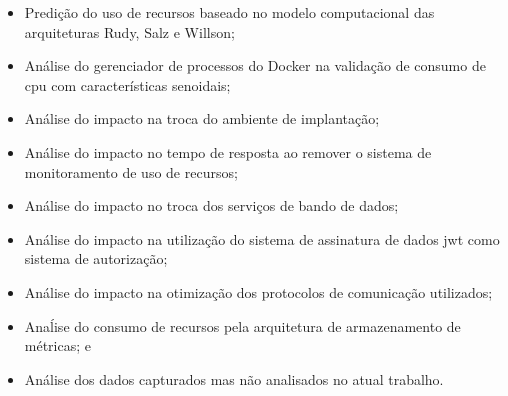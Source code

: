 \begin{itemize}
 \item Predição do uso de recursos baseado no modelo computacional das arquiteturas Rudy, Salz e Willson;
 \item Análise do gerenciador de processos do Docker na validação de consumo de \ac{cpu} com características senoidais;
 \item Análise do impacto na troca do ambiente de implantação;
 \item Análise do impacto no tempo de resposta ao remover o sistema de monitoramento de uso de recursos;
 \item Análise do impacto no troca dos serviços de bando de dados;
 \item Análise do impacto na utilização do sistema de assinatura de dados \ac{jwt} como sistema de autorização;
 \item Análise do impacto na otimização dos protocolos de comunicação utilizados;
 \item Anaĺise do consumo de recursos pela arquitetura de armazenamento de métricas; e
 \item Análise dos dados capturados mas não analisados no atual trabalho.
\end{itemize}
